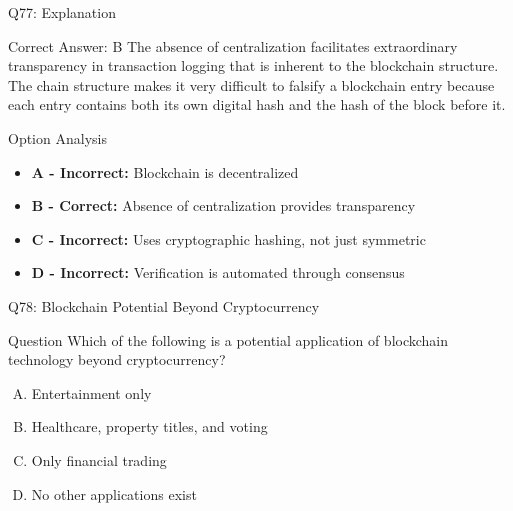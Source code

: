 \documentclass{beamer}
\begin{document}
	\begin{frame}{Q77: Explanation}
		\begin{block}{Correct Answer: B}
			The absence of centralization facilitates extraordinary transparency in transaction logging that is inherent to the blockchain structure. The chain structure makes it very difficult to falsify a blockchain entry because each entry contains both its own digital hash and the hash of the block before it.
		\end{block}
		\begin{block}{Option Analysis}
			\begin{itemize}
				\item \textbf{A - Incorrect:} Blockchain is decentralized
				\item \textbf{B - Correct:} Absence of centralization provides transparency
				\item \textbf{C - Incorrect:} Uses cryptographic hashing, not just symmetric
				\item \textbf{D - Incorrect:} Verification is automated through consensus
			\end{itemize}
		\end{block}
	\end{frame}
	
	\begin{frame}{Q78: Blockchain Potential Beyond Cryptocurrency}
		\begin{block}{Question}
			Which of the following is a potential application of blockchain technology beyond cryptocurrency?
		\end{block}
		\begin{enumerate}[(A)]
			\item Entertainment only
			\item Healthcare, property titles, and voting
			\item Only financial trading
			\item No other applications exist
		\end{enumerate}
	\end{frame}
	
\end{document}

